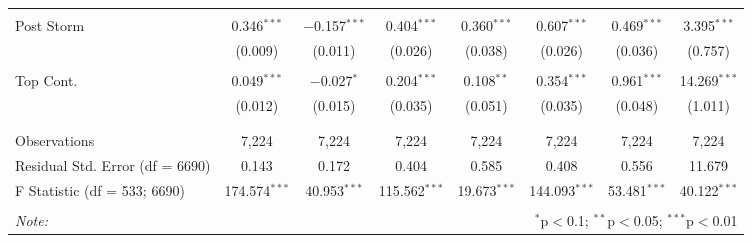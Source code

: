 \begin{table}[!htbp]
\begin{tabular}{@{\extracolsep{5pt}}lccccccc}
  & & & & & & & \\ 
 Post Storm & 0.346$^{***}$ & $-$0.157$^{***}$ & 0.404$^{***}$ & 0.360$^{***}$ & 0.607$^{***}$ & 0.469$^{***}$ & 3.395$^{***}$ \\ 
  & (0.009) & (0.011) & (0.026) & (0.038) & (0.026) & (0.036) & (0.757) \\ 
  & & & & & & & \\ 
 Top Cont. & 0.049$^{***}$ & $-$0.027$^{*}$ & 0.204$^{***}$ & 0.108$^{**}$ & 0.354$^{***}$ & 0.961$^{***}$ & 14.269$^{***}$ \\ 
  & (0.012) & (0.015) & (0.035) & (0.051) & (0.035) & (0.048) & (1.011) \\ 
  & & & & & & & \\ 
\hline \\[-1.8ex] 
Observations & 7,224 & 7,224 & 7,224 & 7,224 & 7,224 & 7,224 & 7,224 \\ 
Residual Std. Error (df = 6690) & 0.143 & 0.172 & 0.404 & 0.585 & 0.408 & 0.556 & 11.679 \\ 
F Statistic (df = 533; 6690) & 174.574$^{***}$ & 40.953$^{***}$ & 115.562$^{***}$ & 19.673$^{***}$ & 144.093$^{***}$ & 53.481$^{***}$ & 40.122$^{***}$ \\ 
\hline 
\hline \\[-1.8ex] 
\textit{Note:}  & \multicolumn{7}{r}{$^{*}$p$<$0.1; $^{**}$p$<$0.05; $^{***}$p$<$0.01} \\ 
\end{tabular} 
\end{table} 
